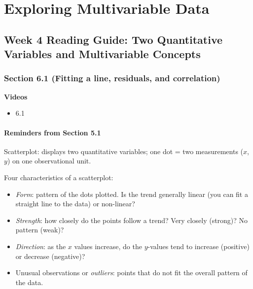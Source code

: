 \documentclass[
]{report}
\providecommand{\tightlist}{%
  \setlength{\itemsep}{0pt}\setlength{\parskip}{0pt}}
\begin{document}
\newpage

\hypertarget{exploring-multivariable-data}{%
\chapter{Exploring Multivariable Data}\label{exploring-multivariable-data}}

\hypertarget{week-4-reading-guide-two-quantitative-variables-and-multivariable-concepts}{%
\section{Week 4 Reading Guide: Two Quantitative Variables and Multivariable Concepts}\label{week-4-reading-guide-two-quantitative-variables-and-multivariable-concepts}}

\hypertarget{section-6.1-fitting-a-line-residuals-and-correlation}{%
\subsection*{Section 6.1 (Fitting a line, residuals, and correlation)}\label{section-6.1-fitting-a-line-residuals-and-correlation}}


\textbf{Videos}

\begin{itemize}
\tightlist
\item
  6.1
\end{itemize}


\hypertarget{reminders-from-section-5.1}{%
\subsubsection*{Reminders from Section 5.1}\label{reminders-from-section-5.1}}

Scatterplot: displays two quantitative variables; one dot = two measurements (\(x\), \(y\)) on one observational unit.

Four characteristics of a scatterplot:

\begin{itemize}
\tightlist
\item
  \emph{Form}: pattern of the dots plotted. Is the trend generally linear (you can fit a straight line to the data) or non-linear?\\
\item
  \emph{Strength}: how closely do the points follow a trend? Very closely (strong)? No pattern (weak)?\\
\item
  \emph{Direction}: as the \(x\) values increase, do the \(y\)-values tend to increase (positive) or decrease (negative)?\\
\item
  Unusual observations or \emph{outliers}: points that do not fit the overall pattern of the data.
\end{itemize}
\end{document}
